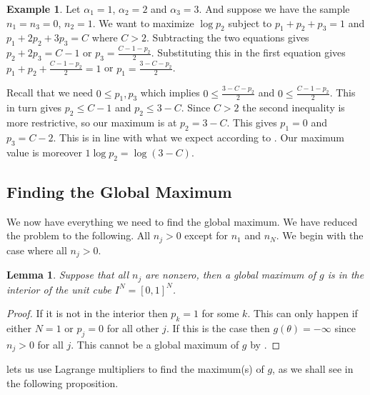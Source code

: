 \documentclass{article}
\theoremstyle{plain}
\newtheorem{lemma}       {\bf Lemma}       [section]
\theoremstyle{definition}
\newtheorem{example}     {\bf Example}     [section]
\begin{document}
\begin{example}\label{simpleexample}
	Let $\alpha_1=1$, $\alpha_2=2$ and $\alpha_3=3$. And suppose we have the sample
	$n_1=n_3=0$, $n_2=1$. We want to maximize $\log p_2$ subject to $p_1+p_2+p_3=1$
	and $p_1+2p_2+3p_3=C$ where $C>2$.
	Subtracting the two equations gives $p_2+2p_3=C-1$ or $p_3=\frac{C-1-p_2}{2}$.
	Substituting this in the first equation gives $p_1+p_2+\frac{C-1-p_2}{2}=1$ or
	$p_1=\frac{3-C-p_2}{2}$.

	Recall that we need $0\leq p_1,p_3$ which implies
	$0\leq\frac{3-C-p_2}{2}$ and $0\leq\frac{C-1-p_2}{2}$. This in turn gives
	$p_2\leq C-1$
	and $p_2\leq 3-C$. Since $C>2$ the second inequality is more restrictive, so our
	maximum is at $p_2=3-C$.
	This gives $p_1=0$ and $p_3=C-2$. This is in line with what we expect according to
	. Our maximum value is moreover $1\log p_2=\log(3-C)$.
\end{example}

\subsection{Finding the Global Maximum}
We now have everything we need to find the global maximum. We have reduced the problem
to the following. All $n_j>0$ except for $n_1$ and $n_N$. We begin with the
case where all $n_j>0$.

\begin{lemma}\label{interior}
	Suppose that all $n_j$ are nonzero, then a global maximum of $g$ is in the
	interior of the unit cube $I^N=[0,1]^N$.
\end{lemma}
\begin{proof}
	If it is not in the interior then $p_k=1$ for some $k$. This can only happen
	if either $N=1$ or $p_j=0$ for all other $j$. If this is the
	case then $g(\theta)=-\infty$ since $n_j>0$ for all $j$. This cannot be
	a global maximum of $g$ by .
\end{proof}

 lets us use Lagrange multipliers to find the maximum(s) of $g$, as we
shall see in the following proposition.
\end{document}
